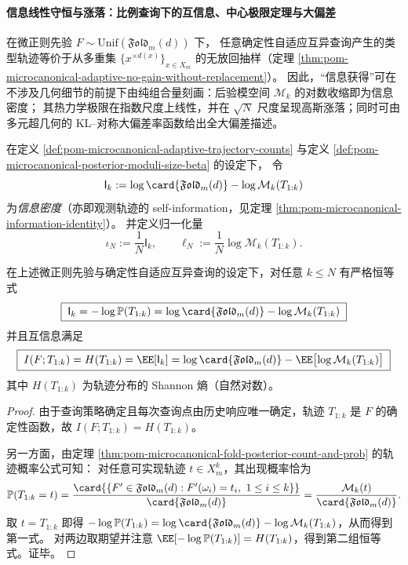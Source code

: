 \paragraph{信息线性守恒与涨落：比例查询下的互信息、中心极限定理与大偏差}
在微正则先验 \(F\sim\mathrm{Unif}(\mathfrak{Fold}_m(d))\) 下，
任意确定性自适应互异查询产生的类型轨迹等价于从多重集 \(\{x^{\times d(x)}\}_{x\in X_m}\) 的无放回抽样（定理 \ref{thm:pom-microcanonical-adaptive-no-gain-without-replacement}）。
因此，“信息获得”可在不涉及几何细节的前提下由纯组合量刻画：后验模空间 \(\mathcal{M}_k\) 的对数收缩即为信息密度；
其热力学极限在指数尺度上线性，并在 \(\sqrt N\) 尺度呈现高斯涨落；同时可由多元超几何的 KL--对称大偏差率函数给出全大偏差描述。

\begin{definition}[信息密度与归一化信息率]\label{def:pom-microcanonical-information-density}
在定义 \ref{def:pom-microcanonical-adaptive-trajectory-counts} 与定义 \ref{def:pom-microcanonical-posterior-moduli-size-beta} 的设定下，
令
\[
\mathsf{I}_k:=\log\card{\mathfrak{Fold}_m(d)}-\log \mathcal{M}_k(T_{1:k})
\]
为\emph{信息密度}（亦即观测轨迹的 self-information，见定理 \ref{thm:pom-microcanonical-information-identity}）。
并定义归一化量
\[
\iota_N:=\frac{1}{N}\mathsf{I}_k,
\qquad
\ell_N:=\frac{1}{N}\log \mathcal{M}_k(T_{1:k}).
\]
\end{definition}

\begin{theorem}[信息密度的精确模空间表示]\label{thm:pom-microcanonical-information-identity}
在上述微正则先验与确定性自适应互异查询的设定下，对任意 \(k\le N\) 有严格恒等式
\[
\boxed{\;
\mathsf{I}_k
=-\log\mathbb{P}(T_{1:k})
=\log\card{\mathfrak{Fold}_m(d)}-\log \mathcal{M}_k(T_{1:k})\;}
\]
并且互信息满足
\[
\boxed{\;
I(F;T_{1:k})=H(T_{1:k})
=\EE[\mathsf{I}_k]
=\log\card{\mathfrak{Fold}_m(d)}-\EE\bigl[\log \mathcal{M}_k(T_{1:k})\bigr]\;}
\]
其中 \(H(T_{1:k})\) 为轨迹分布的 Shannon 熵（自然对数）。
\end{theorem}
\begin{proof}
由于查询策略确定且每次查询点由历史响应唯一确定，轨迹 \(T_{1:k}\) 是 \(F\) 的确定性函数，故 \(I(F;T_{1:k})=H(T_{1:k})\)。
\par
另一方面，由定理 \ref{thm:pom-microcanonical-fold-posterior-count-and-prob} 的轨迹概率公式可知：
对任意可实现轨迹 \(t\in X_m^k\)，其出现概率恰为
\[
\mathbb{P}(T_{1:k}=t)=\frac{\card{\{F'\in\mathfrak{Fold}_m(d):F'(\omega_i)=t_i,\ 1\le i\le k\}}}{\card{\mathfrak{Fold}_m(d)}}
=\frac{\mathcal{M}_k(t)}{\card{\mathfrak{Fold}_m(d)}}.
\]
取 \(t=T_{1:k}\) 即得
\(
-\log\mathbb{P}(T_{1:k})
=\log\card{\mathfrak{Fold}_m(d)}-\log\mathcal{M}_k(T_{1:k})
\)，从而得到第一式。
对两边取期望并注意 \(\EE[-\log\mathbb{P}(T_{1:k})]=H(T_{1:k})\)，得到第二组恒等式。证毕。
\end{proof}

